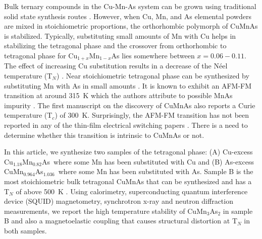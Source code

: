 \documentclass[10pt,doublespacing,edeposit]{uiucthesis2020}
\newcommand*{\cumnas}{Cu$_{0.82}$Mn$_{1.18}$As}
\newcommand*{\cuexcess}{Cu$_{1.18}$Mn$_{0.82}$As}
\newcommand*{\asexcess}{CuMn$_{0.964}$As$_{1.036}$}
\begin{document}
\begin{mainmatter}
Bulk ternary compounds in the Cu-Mn-As system can be grown using traditional solid state synthesis routes \cite{Uhlirova2015,Uhlirova2019,Karigerasi2019}. However, when Cu, Mn, and As elemental powders are mixed in stoichiometric proportions, the orthorhombic polymorph of CuMnAs is stabilized. Typically, substituting small amounts of Mn with Cu helps in stabilizing the tetragonal phase and the crossover from orthorhombic to tetragonal phase for Cu$_{1+x}$Mn$_{1-x}$As lies somewhere between $x = 0.06 - 0.11$. The effect of increasing Cu substitution results in a decrease of the N\'eel temperature (T$_N$) \cite{Uhlirova2019}. Near stoichiometric tetragonal phase can be synthesized by substituting Mn with As in small amounts \cite{Uhlirova2019,Volny2020}. It is known to exhibit an AFM-FM transition at around 315~K which the authors attribute to possible MnAs impurity \cite{Uhlirova2019}. The first manuscript on the discovery of CuMnAs also reports a Curie temperature (T$_c$) of 300~K. Surprisingly, the AFM-FM transition has not been reported in any of the thin-film electrical switching papers \cite{Wadley2016,Meinert2018,Matalla-Wagner2019}. There is a need to determine whether this transition is intrinsic to CuMnAs or not.


In this article, we synthesize two samples of the tetragonal phase: (A) Cu-excess \cuexcess\ where some Mn has been substituted with Cu and (B) As-excess \asexcess\ where some Mn has been substituted with As. Sample B is the most stoichiometric bulk tetragonal CuMnAs that can be synthesized and has a T$_N$ of above 500~K \cite{Uhlirova2019}. Using calorimetry, superconducting quantum interference device (SQUID) magnetometry, synchrotron x-ray and neutron diffraction measurements, we report the high temperature stability of CuMn$_3$As$_2$ in sample B and also a magnetoelastic coupling that causes structural distortion at T$_N$ in both samples.


\end{mainmatter}
\end{document}
